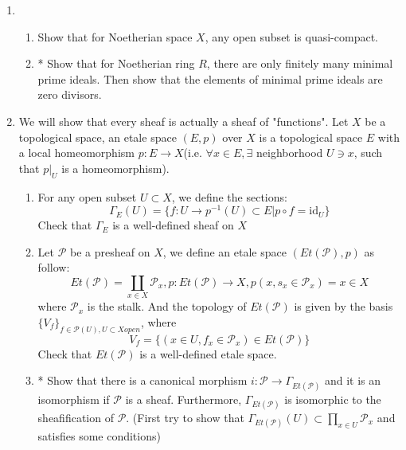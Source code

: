 \documentclass[a4paper,11pt]{article}
\def\mrm#1{\mathrm{#1}}
\def\Hom{\mathrm{Hom}}
\begin{document}
\begin{enumerate}[1.]
\item \begin{enumerate}
    \item Show that for Noetherian space $X$, any open subset is quasi-compact.
    \item* Show that for Noetherian ring $R$, there are only finitely many minimal prime ideals. Then show that the elements of minimal prime ideals are zero divisors.
\end{enumerate}
\item We will show that every sheaf is actually a sheaf of "functions". Let $X$ be a topological space, an etale space $(E,p)$ over $X$ is a topological space $E$ with a local homeomorphism $p:E\to X$(i.e. $\forall x\in E, \exists$ neighborhood $U\ni x$, such that $p|_U$ is a homeomorphism).
\begin{enumerate}
    \item For any open subset $U \subset X$, we define the sections:
    \[ \Gamma_E(U) = \{f:U\to p^{-1}(U)\subset E| p\circ f=\mrm{id}_U\}
        \]
    Check that $\Gamma_E$ is a well-defined sheaf on $X$
    \item Let $\mathcal{P}$ be a presheaf on $X$, we define an etale space $(Et(\mathcal{P}),p)$ as follow:
    \[Et(\mathcal{P})=\coprod _{x\in X} \mathcal{P}_x , p:Et(\mathcal{P})\to X, p(x, s_x\in \mathcal{P}_x)= x\in X\]
    where $\mathcal{P}_x$ is the stalk. And the topology of $Et(\mathcal{P}) $ is given by the basis $\{V_f\}_{f\in \mathcal{P}(U),U\subset X open}$, where 
    \[ V_f=\{(x\in U, f_x \in \mathcal{P}_x)\in Et(\mathcal{P})\}\]
    Check that $Et(\mathcal{P})$ is a well-defined etale space.
    \item* Show that there is a canonical morphism $i:\mathcal{P}\to \Gamma_{Et(\mathcal{P})}$ and it is an isomorphism if $\mathcal{P}$ is a sheaf. Furthermore, $\Gamma_{Et(\mathcal{P})}$ is isomorphic to the sheafification of $\mathcal{P}$. (First try to show that $\Gamma_{Et(\mathcal{P})}(U)\subset \prod_{x\in U} \mathcal{P}_x$ and satisfies some conditions)
\end{enumerate}




\end{enumerate}
\end{document}
